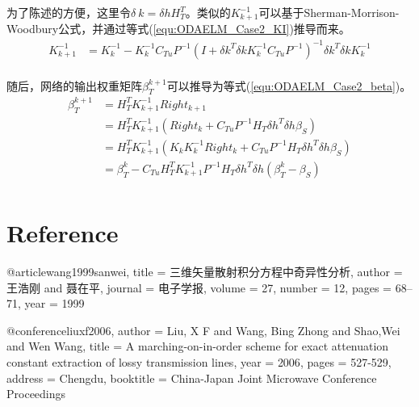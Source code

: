 为了陈述的方便，这里令$\delta\ k= \delta h H_T^T$。类似的$K_{k+1}^{-1}$可以基于Sherman-Morrison-Woodbury公式，并通过等式(\ref{equ:ODAELM_Case2_KI})推导而来。
\begin{equation}
\label{equ:ODAELM_Case2_KI}
\begin{aligned}
K_{k+1}^{-1} & = K_{k}^{-1} -K_{k}^{-1} C_{Tu} P^{-1} (I+ \delta k^T \delta k K_{k}^{-1} C_{Tu} P^{-1})^{-1} \delta k^T \delta k K_{k}^{-1} \\
\end{aligned}
\end{equation}

随后，网络的输出权重矩阵$\beta_T^{k+1}$可以推导为等式(\ref{equ:ODAELM_Case2_beta})。
\begin{equation}
\label{equ:ODAELM_Case2_beta}
\begin{aligned}
\beta_T^{k+1} &=H_T^T K_{k+1}^{-1} Right_{k+1} \\
&=H_T^T K_{k+1}^{-1} (Right_k+C_{Tu} P^{-1} H_T \delta h^T \delta h \beta_S) \\
&=H_T^T K_{k+1}^{-1} (K_k K_k^{-1}Right_k +C_{Tu} P^{-1} H_T \delta h^T \delta h \beta_S) \\
&=\beta_T^{k}- C_{Tu} H_T^{T} K_{k+1}^{-1} P^{-1}H_T \delta h^T \delta h (\beta_T^{k}-\beta_S) \\
\end{aligned}
\end{equation}

\section{Reference}


@article{wang1999sanwei,
  title = {三维矢量散射积分方程中奇异性分析},
  author = {王浩刚 and 聂在平},
  journal = {电子学报},
  volume = {27},
  number = {12},
  pages = {68--71},
  year = {1999}
}


@conference{liuxf2006,
  author = {Liu, X F and Wang, Bing Zhong and Shao,Wei and Wen Wang},
  title = {A marching-on-in-order scheme for exact attenuation constant extraction of lossy transmission lines},
  year = {2006},
  pages = {527-529},
  address = {Chengdu},
  booktitle = {China-Japan Joint Microwave Conference Proceedings}
}

